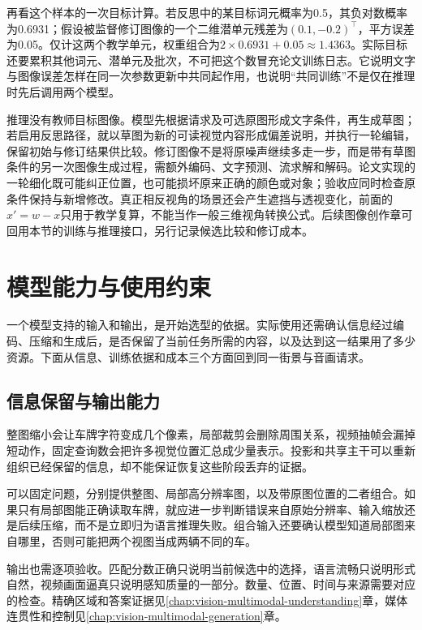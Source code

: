 再看这个样本的一次目标计算。若反思中的某目标词元概率为0.5，其负对数概率为0.6931；假设被监督修订图像的一个二维潜单元残差为$(0.1,-0.2)^\top$，平方误差为0.05。仅计这两个教学单元，权重组合为$2\times0.6931+0.05\approx1.4363$。实际目标还要累积其他词元、潜单元及批次，不可把这个数冒充论文训练日志。它说明文字与图像误差怎样在同一次参数更新中共同起作用，也说明“共同训练”不是仅在推理时先后调用两个模型。

推理没有教师目标图像。模型先根据请求及可选原图形成文字条件，再生成草图；若启用反思路径，就以草图为新的可读视觉内容形成偏差说明，并执行一轮编辑，保留初始与修订结果供比较。修订图像不是将原噪声继续多走一步，而是带有草图条件的另一次图像生成过程，需额外编码、文字预测、流求解和解码。论文实现的一轮细化既可能纠正位置，也可能损坏原来正确的颜色或对象；验收应同时检查原条件保持与新增修改。真正相反视角的场景还会产生遮挡与透视变化，前面的$x'=w-x$只用于教学复算，不能当作一般三维视角转换公式。后续图像创作章可回用本节的训练与推理接口，另行记录候选比较和修订成本。

\section{模型能力与使用约束}
\label{sec:vision-models-constraints}

一个模型支持的输入和输出，是开始选型的依据。实际使用还需确认信息经过编码、压缩和生成后，是否保留了当前任务所需的内容，以及达到这一结果用了多少资源。下面从信息、训练依据和成本三个方面回到同一街景与音画请求。

\subsection{信息保留与输出能力}
\label{sec:vision-models-information}

整图缩小会让车牌字符变成几个像素，局部裁剪会删除周围关系，视频抽帧会漏掉短动作，固定查询数会把许多视觉位置汇总成少量表示。投影和共享主干可以重新组织已经保留的信息，却不能保证恢复这些阶段丢弃的证据。

可以固定问题，分别提供整图、局部高分辨率图，以及带原图位置的二者组合。如果只有局部图能正确读取车牌，就应进一步判断错误来自原始分辨率、输入缩放还是后续压缩，而不是立即归为语言推理失败。组合输入还要确认模型知道局部图来自哪里，否则可能把两个视图当成两辆不同的车。

输出也需逐项验收。匹配分数正确只说明当前候选中的选择，语言流畅只说明形式自然，视频画面逼真只说明感知质量的一部分。数量、位置、时间与来源需要对应的检查。精确区域和答案证据见\ref{chap:vision-multimodal-understanding}章，媒体连贯性和控制见\ref{chap:vision-multimodal-generation}章。

